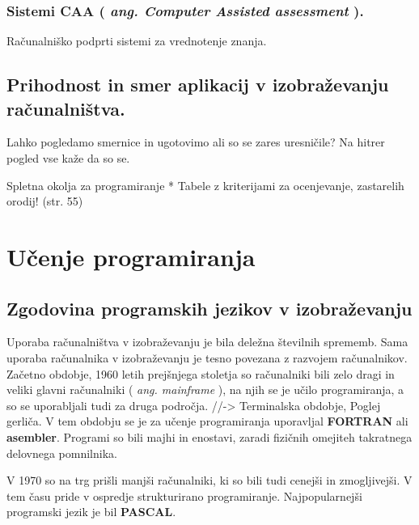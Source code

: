 \subsubsection{\texorpdfstring{Sistemi CAA ( \emph{ang. Computer
      Assisted assessment} ).}{Sistemi CAA ( ang. Computer Assisted
    assessment ).}}
\label{sistemi-caa-ang.-computer-assisted-assessment-.}

Računalniško podprti sistemi za vrednotenje znanja.


\subsection{Prihodnost in smer aplikacij v izobraževanju
  računalništva.}
\label{prihodnost-in-smer-aplikacij-v-izo-rac}

Lahko pogledamo smernice in ugotovimo ali so se zares uresničile? Na
hitrer pogled vse kaže da so se.

Spletna okolja za programiranje * Tabele z kriterijami za ocenjevanje,
zastarelih orodij! (str. 55)

\section{Učenje programiranja}
\label{sec:učenje_programiranja}

\subsection{Zgodovina programskih jezikov v izobraževanju}
\label{sec:zgodovina_programskih_jezikov}

Uporaba računalništva v izobraževanju je bila deležna številnih
sprememb. Sama uporaba računalnika v izobraževanju je tesno
povezana z razvojem računalnikov.  Začetno obdobje, 1960 letih
prejšnjega stoletja so računalniki bili zelo dragi in veliki glavni
računalniki ( \emph{ang. mainframe} ), na njih se je učilo
programiranja, a so se uporabljali tudi za druga področja.
//-\textgreater{} Terminalska obdobje, Poglej gerliča. V tem obdobju
se je za učenje programiranja uporavljal \textbf{FORTRAN} ali
\textbf{asembler}. Programi so bili majhi in enostavi, zaradi fizičnih
omejiteh takratnega delovnega pomnilnika.

V 1970 so na trg prišli manjši računalniki, ki so bili tudi cenejši in
zmogljivejši. V tem času pride v ospredje strukturirano programiranje.
Najpopularnejši programski jezik je bil \textbf{PASCAL}.

